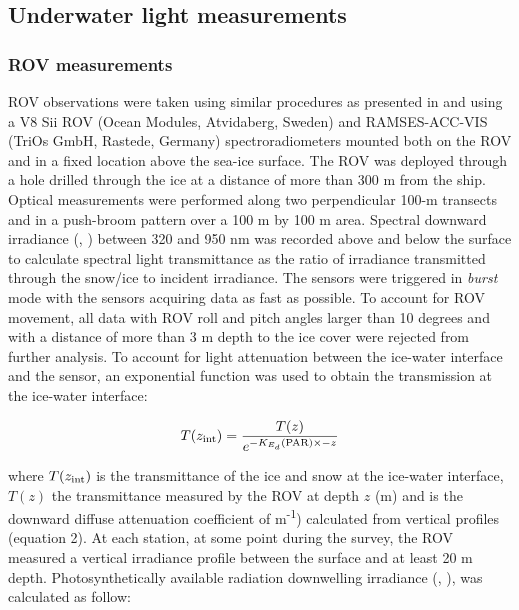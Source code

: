 \subsection{Underwater light measurements}

\subsubsection{ROV measurements}

ROV observations were taken using similar procedures as presented in \citet{Nicolaus2013} and \citet{Katlein2017} using a V8 Sii ROV (Ocean Modules, Atvidaberg, Sweden) and RAMSES-ACC-VIS (TriOs GmbH, Rastede, Germany) spectroradiometers mounted both on the ROV and in a fixed location above the sea-ice surface. The ROV was deployed through a hole drilled through the ice at a distance of more than 300 m from the ship. Optical measurements were performed along two perpendicular 100-m transects and in a push-broom pattern over a 100 m by 100 m area. Spectral downward irradiance (\ed{}, \wmsquare) between 320 and 950 nm was recorded above and below the surface to calculate spectral light transmittance as the ratio of irradiance transmitted through the snow/ice to incident irradiance. The sensors were triggered in \textit{burst} mode with the sensors acquiring data as fast as possible. To account for ROV movement, all data with ROV roll and pitch angles larger than 10 degrees and with a distance of more than 3 m depth to the ice cover were rejected from further analysis. To account for light attenuation between the ice-water interface and the sensor, an exponential function was used to obtain the transmission at the ice-water interface:

\begin{linenomath*}
	\begin{equation}
		T(z_\textnormal{int}) = \frac{T(z)}{e^{-K_{E_d}(\textnormal{PAR}){} \times -z}}
	\end{equation}
\end{linenomath*}

\noindent where $T(z_\textnormal{int})$ is the transmittance of the ice and snow at the ice-water interface, $T(z)$ the \DIFdelbegin {}\DIFdelend \DIFaddbegin {}\DIFaddend transmittance measured by the ROV at depth $z$ (m) and \kdpar{} is the downward diffuse attenuation coefficient of \DIFdelbegin {}\DIFdelend \DIFaddbegin {}\DIFaddend m\textsuperscript{-1}) calculated from \epar{} vertical profiles (equation 2). At each station, at some point during the survey, the ROV measured a vertical irradiance profile between the surface and at least 20 m depth. Photosynthetically available radiation downwelling irradiance (\eparz{}, \micromol{}), was calculated as follow:

